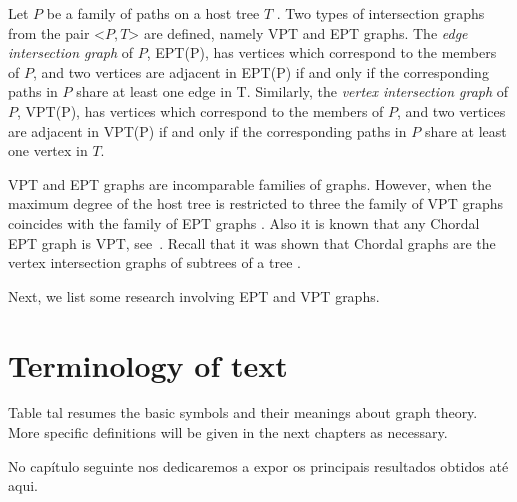  Let $P$ be a family of paths on a host tree $T$ . Two types of intersection graphs from the pair <$P,T$> are defined, namely VPT and EPT graphs.
The \textit{edge intersection graph} of $P$, EPT(P), has vertices which correspond to the members of $P$, and two vertices are adjacent in EPT(P) if and only if the corresponding paths in $P$ share at least one edge in T. Similarly, the \textit{vertex intersection graph} of $P$, VPT(P), has vertices which correspond to the members of $P$, and two vertices are adjacent in VPT(P) if and only if the corresponding paths in $P$ share at least one vertex in $T$.

VPT and EPT graphs are incomparable families of graphs. However, when the maximum degree of the host tree is restricted to three the family of
VPT graphs coincides with the family of EPT graphs \cite{golumbic1985edge}. Also it is known that any Chordal EPT graph is VPT, see~\cite{syslo1985triangulated}. Recall that it was shown that Chordal graphs are the vertex intersection graphs of subtrees of a tree \cite{gavril1974intersection}.

Next, we list some research involving EPT and VPT graphs.








\section{Terminology of text}

Table tal resumes the basic symbols and their meanings about graph theory.
More specific definitions will be given in the next chapters as necessary.



 No capítulo seguinte nos dedicaremos a expor os principais resultados obtidos até aqui.

